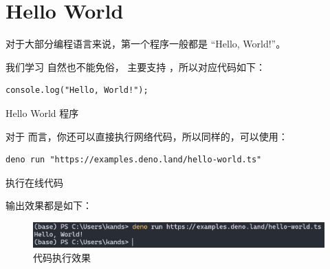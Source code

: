 \section{Hello World}

对于大部分编程语言来说，第一个程序一般都是 ``Hello, World!''。

我们学习 \Deno 自然也不能免俗，
\Deno 主要支持 \TypeScript，所以对应代码如下：

\begin{table}[H]
    \begin{verbatim}
console.log("Hello, World!");
    \end{verbatim}
    \caption{Hello World 程序}
    \label{code:beginner:hello-world}
\end{table}

对于 \Deno 而言，你还可以直接执行网络代码，所以同样的，可以使用：

\begin{table}[H]
    \begin{verbatim}
deno run "https://examples.deno.land/hello-world.ts"
    \end{verbatim}
    \caption{执行在线代码}
    \label{code:beginner:execute-online}
\end{table}

输出效果都是如下：

\begin{figure}[H]
    \centering
    \includegraphics[scale=0.48]{pics/beginner-hello-world-p01.png}
    \caption{代码执行效果}
    \label{fig:beginner:hello-world:p01}
\end{figure}
